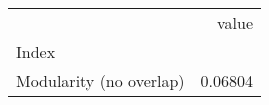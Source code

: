 \begin{tabular}{lr}
\toprule
{} &    value \\
Index                   &          \\
\midrule
Modularity (no overlap) &  0.06804 \\
\bottomrule
\end{tabular}
